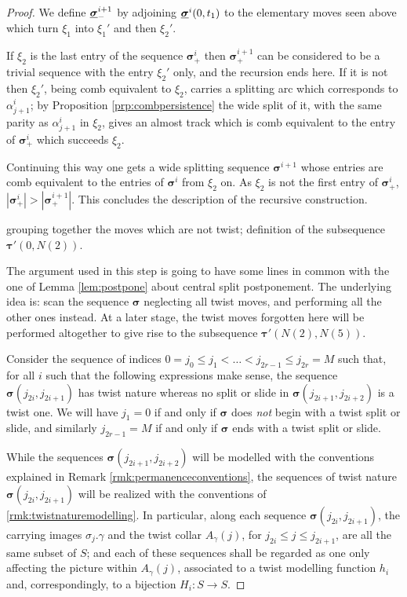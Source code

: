 \begin{proof}
We define $\underline{\bm\sigma}^{i+1}_-$ by adjoining $\underline{\bm\sigma}^i(0,t_1)$ to the elementary moves seen above which turn $\xi_1$ into $\xi_1'$ and then $\xi_2'$.

If $\xi_2$ is the last entry of the sequence $\bm\sigma^i_+$ then $\bm\sigma^{i+1}_+$ can be considered to be a trivial sequence with the entry $\xi_2'$ only, and the recursion ends here. If it is not then $\xi_2'$, being comb equivalent to $\xi_2$, carries a splitting arc which corresponds to $\alpha^i_{j+1}$; by Proposition \ref{prp:combpersistence} the wide split of it, with the same parity as $\alpha^i_{j+1}$ in $\xi_2$, gives an almost track which is comb equivalent to the entry of $\bm\sigma^i_+$ which succeeds $\xi_2$.

Continuing this way one gets a wide splitting sequence $\bm\sigma^{i+1}$ whose entries are comb equivalent to the entries of $\bm\sigma^i$ from $\xi_2$ on. As $\xi_2$ is not the first entry of $\bm\sigma^i_+$, $|\bm\sigma^i_+|>|\bm\sigma^{i+1}_+|$. This concludes the description of the recursive construction.

 grouping together the moves which are not twist; definition of the subsequence $\bm\tau'(0,N(2))$.

The argument used in this step is going to have some lines in common with the one of Lemma \ref{lem:postpone} about central split postponement. The underlying idea is: scan the sequence $\bm\sigma$ neglecting all twist moves, and performing all the other ones instead. At a later stage, the twist moves forgotten here will be performed altogether to give rise to the subsequence $\bm\tau'(N(2),N(5))$.

Consider the sequence of indices $0=j_0\leq j_1<\ldots <j_{2r-1}\leq j_{2r}=M$ such that, for all $i$ such that the following expressions make sense, the sequence $\bm\sigma(j_{2i},j_{2i+1})$ has twist nature whereas no split or slide in $\bm\sigma(j_{2i+1},j_{2i+2})$ is a twist one. We will have $j_1=0$ if and only if $\bm\sigma$ does \emph{not} begin with a twist split or slide, and similarly $j_{2r-1}=M$ if and only if $\bm\sigma$ ends with a twist split or slide.

While the sequences $\bm\sigma(j_{2i+1},j_{2i+2})$ will be modelled with the conventions explained in Remark \ref{rmk:permanenceconventions}, the sequences of twist nature $\bm\sigma(j_{2i},j_{2i+1})$ will be realized with the conventions of \ref{rmk:twistnaturemodelling}. In particular, along each sequence $\bm\sigma(j_{2i},j_{2i+1})$, the carrying images $\sigma_j.\gamma$ and the twist collar $A_\gamma(j)$, for $j_{2i}\leq j\leq j_{2i+1}$, are all the same subset of $S$; and each of these sequences shall be regarded as one only affecting the picture within $A_\gamma(j)$, associated to a twist modelling function $h_i$ and, correspondingly, to a bijection $H_i:S\rightarrow S$.


\end{proof}
